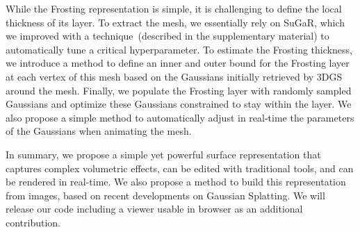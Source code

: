 While the Frosting representation is simple, it is challenging to define the local thickness of its layer. To extract the mesh, we essentially rely on SuGaR, which we improved with a technique~(described in the supplementary material) to automatically tune a critical hyperparameter. To estimate the Frosting thickness, we introduce a method to define an inner and outer bound for the Frosting layer at each vertex of this mesh based on the Gaussians initially retrieved by 3DGS around the mesh.  Finally, we populate the Frosting layer with randomly sampled Gaussians and optimize these Gaussians constrained to stay within the layer. We also propose a simple method to automatically adjust in real-time the parameters of the Gaussians when animating the mesh.

In summary, we propose a simple yet powerful surface representation that captures complex volumetric effects, can be edited with traditional tools, and can be rendered in real-time. We also propose a method to build this representation from images, based on recent developments on Gaussian Splatting. We will release our code including a viewer usable in browser as an additional contribution. 